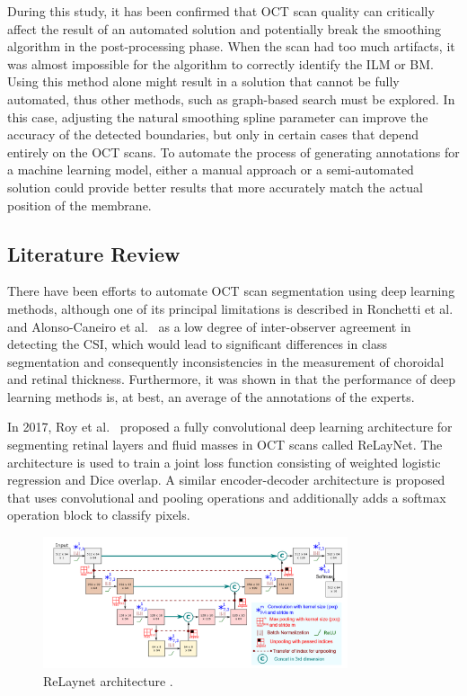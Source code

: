 \documentclass[12pt,a4paper]{scrartcl}
\begin{document}
During this study, it has been confirmed that OCT scan quality can critically affect the result of an automated solution and potentially break the smoothing algorithm in the post-processing phase. When the scan had too much artifacts, it was almost impossible for the algorithm to correctly identify the ILM or BM. Using this method alone might result in a solution that cannot be fully automated, thus other methods, such as graph-based search must be explored. In this case, adjusting the natural smoothing spline parameter can improve the accuracy of the detected boundaries, but only in certain cases that depend entirely on the OCT scans. To automate the process of generating annotations for a machine learning model, either a manual approach or a semi-automated solution could provide better results that more accurately match the actual position of the membrane.  

\subsection{Literature Review}
There have been efforts to automate OCT scan segmentation using deep learning methods, although one of its principal limitations is described in Ronchetti et al.~\cite{Ronchetti2019} and Alonso-Caneiro et al.~\cite{Alonso-Caneiro2013} as a low degree of inter-observer agreement in detecting the CSI, which would lead to significant differences in class segmentation and consequently inconsistencies in the measurement of choroidal and retinal thickness. Furthermore, it was shown in \cite{Maloca2021} that the performance of deep learning methods is, at best, an average of the annotations of the experts.

In 2017, Roy et al.~\cite{Roy2017} proposed a fully convolutional deep learning architecture for segmenting  retinal layers and fluid masses in OCT scans called ReLayNet. The architecture is used to train a joint loss function consisting of weighted logistic regression and Dice overlap. A similar encoder-decoder architecture is proposed that uses convolutional and pooling operations and additionally adds a softmax operation block to classify pixels.

\begin{figure}[H]
    \centering
    \includegraphics[width=0.8\textwidth]{./images/relaynet-architecture.png}
    \caption{ReLaynet architecture \cite{Roy2017}.}
\end{figure}
\end{document}

